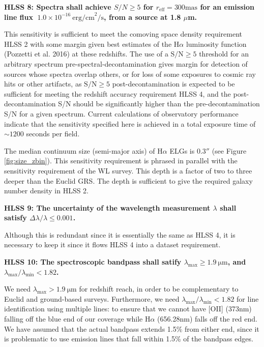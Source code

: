  \noindent
 {\bf HLSS 8: Spectra shall achieve $S/N \geq 5$ for $r_\mathrm{eff} = 300
 \mathrm{mas}$ for an emission line
 flux $~ 1.0\times10^{-16}\ \mathrm{erg/cm}^2\mathrm{/s}$, from a source at 1.8 $\mu$m.}

 This sensitivity is sufficient to meet the comoving space density requirement
 HLSS 2 with some margin given best estimates of the H$\alpha$ luminosity function
 (Pozzetti et al. 2016) at these redshifts. The use of a $\mathrm{S/N} \geq 5$ threshold for an
 arbitrary spectrum pre-spectral-decontamination gives margin for detection of
 sources whose spectra overlap others, or for loss of some exposures to cosmic
 ray hits or other artifacts, as $\mathrm{S/N} \geq 5$ post-decontamination is expected to be
 sufficient for meeting the redshift accuracy requirement HLSS 4, and the
 post-decontamination S/N should be significantly higher than the
 pre-decontamination S/N for a given spectrum. Current calculations of
 observatory performance indicate that the sensitivity specified here is achieved
 in a total exposure time of  $\sim1200$ seconds per field.

 The median continuum size (semi-major axis) of H$\alpha$ ELGs is $0.3''$ (see Figure \ref{fig:size_zbin}).
 This sensitivity requirement is phrased in parallel with the sensitivity requirement
 of the WL survey. This depth is a factor of two to three deeper than the Euclid
 GRS. The depth is sufficient to give the required galaxy number density in HLSS 2.

 \noindent
 {\bf HLSS 9: The uncertainty of the wavelength measurement $\lambda$ shall satisfy
 $\Delta\lambda/\lambda \leq 0.001$. }

 Although this is redundant since it is essentially the same as HLSS 4, it is
 necessary to keep it since it flows HLSS 4 into a dataset requirement.

 \noindent
 {\bf HLSS 10: The spectroscopic bandpass shall satify $\lambda_\mathrm{max} \geq 1.9
 \ \mathrm{\mu m}$, and $\lambda_\mathrm{max}/\lambda_\mathrm{min} < 1.82$.}

 We need $\lambda_\mathrm{max} > 1.9\ \mathrm{ \mu m}$ for redshift reach, in order to be complementary
 to Euclid and ground-based surveys.  Furthermore, we need
 $\lambda_\mathrm{max}/\lambda_\mathrm{min} < 1.82$ for line identification using
 multiple lines: to ensure that we cannot have [OII] (373nm) falling off the blue
 end of our coverage while H$\alpha$ (656.28nm) falls off the red end. We have
 assumed that the actual bandpass extends 1.5\% from either end, since it is
 problematic to use emission lines that fall within 1.5\% of the bandpass edges.

